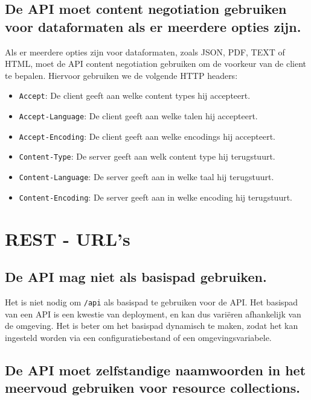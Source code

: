 \subsection{De API moet content negotiation gebruiken voor dataformaten als er meerdere opties zijn.}
\label{section:content_negotiation}

Als er meerdere opties zijn voor dataformaten, zoals JSON, PDF, TEXT of HTML, moet de API content negotiation gebruiken om de voorkeur van de client te bepalen. Hiervoor gebruiken we de volgende HTTP headers:

\begin{itemize}
    \item \texttt{Accept}: De client geeft aan welke content types hij accepteert.
    \item \texttt{Accept-Language}: De client geeft aan welke talen hij accepteert.
    \item \texttt{Accept-Encoding}: De client geeft aan welke encodings hij accepteert.
    \item \texttt{Content-Type}: De server geeft aan welk content type hij terugstuurt.
    \item \texttt{Content-Language}: De server geeft aan in welke taal hij terugstuurt.
    \item \texttt{Content-Encoding}: De server geeft aan in welke encoding hij terugstuurt.
\end{itemize}

\section{REST - URL's}

\subsection{De API mag niet  als basispad gebruiken.}
\label{section:geen_api_basispad}

Het is niet nodig om \texttt{/api} als basispad te gebruiken voor de API. Het basispad van een API is een kwestie van deployment, en kan dus variëren afhankelijk van de omgeving. Het is beter om het basispad dynamisch te maken, zodat het kan ingesteld worden via een configuratiebestand of een omgevingsvariabele.

\subsection{De API moet zelfstandige naamwoorden in het meervoud gebruiken voor resource collections.}
\label{section:meervoud_resource_collections}

